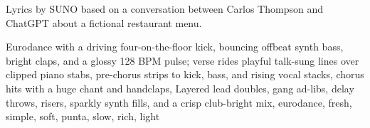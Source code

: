 
\begin{notes}
Lyrics by SUNO based on a conversation between Carlos Thompson and ChatGPT about a fictional restaurant menu.
\end{notes}
\begin{style}
Eurodance with a driving four-on-the-floor kick, bouncing offbeat synth bass, bright claps, and a glossy 128 BPM pulse; verse rides playful talk-sung lines over clipped piano stabs, pre-chorus strips to kick, bass, and rising vocal stacks, chorus hits with a huge chant and handclaps, Layered lead doubles, gang ad-libs, delay throws, risers, sparkly synth fills, and a crisp club-bright mix, eurodance, fresh, simple, soft, punta, slow, rich, light
\end{style}
